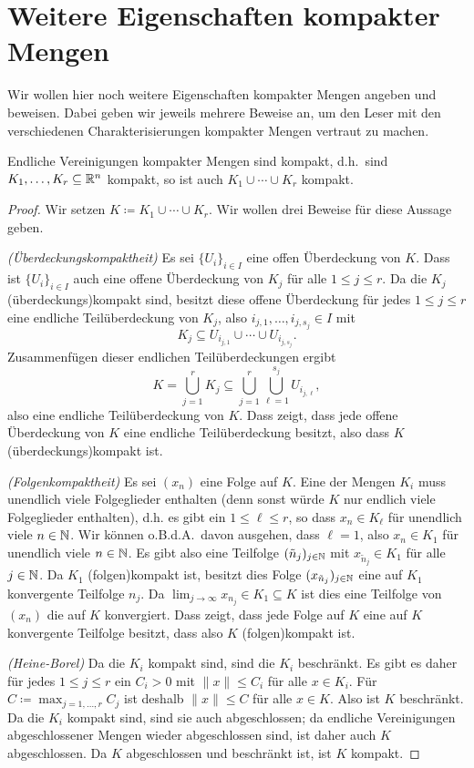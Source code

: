 \documentclass[a4paper,10pt]{article}
\begin{document}
\section{Weitere Eigenschaften kompakter Mengen}
Wir wollen hier noch weitere Eigenschaften kompakter Mengen angeben und beweisen. Dabei geben wir jeweils mehrere Beweise an, um den Leser mit den verschiedenen Charakterisierungen kompakter Mengen vertraut zu machen.


\begin{lem}
 Endliche Vereinigungen kompakter Mengen sind kompakt, d.h.\ sind $K_1, \dotsc, K_r \subseteq \mathbb{R}^n$ kompakt, so ist auch $K_1 \cup \dotsb \cup K_r$ kompakt.
\end{lem}
\begin{proof}
 Wir setzen $K \coloneqq K_1 \cup \dotsb \cup K_r$. Wir wollen drei Beweise für diese Aussage geben.
 
 \emph{(Überdeckungskompaktheit)} Es sei $\{U_i\}_{i \in I}$ eine offen Überdeckung von $K$. Dass ist $\{U_i\}_{i \in I}$ auch eine offene Überdeckung von $K_j$ für alle $1 \leq j \leq r$. Da die $K_j$ (überdeckungs)kompakt sind, besitzt diese offene Überdeckung für jedes $1 \leq j \leq r$ eine endliche Teilüberdeckung von $K_j$, also $i_{j,1}, \dotsc, i_{j,s_j} \in I$ mit
 \[
  K_j \subseteq U_{i_{j,1}} \cup \dotsb \cup U_{i_{j,s_j}}.
 \]
 Zusammenfügen dieser endlichen Teilüberdeckungen ergibt
 \[
  K
  = \bigcup_{j=1}^r K_j
  \subseteq \bigcup_{j=1}^r \bigcup_{\ell=1}^{s_j} U_{i_{j,\ell}},
 \]
 also eine endliche Teilüberdeckung von $K$. Dass zeigt, dass jede offene Überdeckung von $K$ eine endliche Teilüberdeckung besitzt, also dass $K$ (über\-deck\-ungs)kom\-pakt ist.
 
 \emph{(Folgenkompaktheit)} Es sei $(x_n)$ eine Folge auf $K$. Eine der Mengen $K_i$ muss unendlich viele Folgeglieder enthalten (denn sonst würde $K$ nur endlich viele Folgeglieder enthalten), d.h. es gibt ein $1 \leq \ell \leq r$, so dass $x_n \in K_\ell$ für unendlich viele $n \in \mathbb{N}$. Wir können o.B.d.A.\ davon ausgehen, dass $\ell = 1$, also $x_n \in K_1$ für unendlich viele $n \in \mathbb{N}$. Es gibt also eine Teilfolge $(\tilde{n}_j)_{j \in \mathbb{N}}$ mit $x_{\tilde{n}_j} \in K_1$ für alle $j \in \mathbb{N}$. Da $K_1$ (folgen)kompakt ist, besitzt dies Folge $(x_{\tilde{n}_j})_{j \in \mathbb{N}}$ eine auf $K_1$ konvergente Teilfolge $n_j$. Da $\lim_{j \to \infty} x_{n_j} \in K_1 \subseteq K$ ist dies eine Teilfolge von $(x_n)$ die auf $K$ konvergiert. Dass zeigt, dass jede Folge auf $K$ eine auf $K$ konvergente Teilfolge besitzt, dass also $K$ (folgen)kompakt ist.
 
 \emph{(Heine-Borel)} Da die $K_i$ kompakt sind, sind die $K_i$ beschränkt. Es gibt es daher für jedes $1 \leq j \leq r$ ein $C_i > 0$ mit $\|x\| \leq C_i$ für alle $x \in K_i$. Für $C \coloneqq \max_{j=1,\dotsc,r} C_j$ ist deshalb $\|x\| \leq C$ für alle $x \in K$. Also ist $K$ beschränkt. Da die $K_i$ kompakt sind, sind sie auch abgeschlossen; da endliche Vereinigungen abgeschlossener Mengen wieder abgeschlossen sind, ist daher auch $K$ abgeschlossen. Da $K$ abgeschlossen und beschränkt ist, ist $K$ kompakt.
\end{proof}
\end{document}

